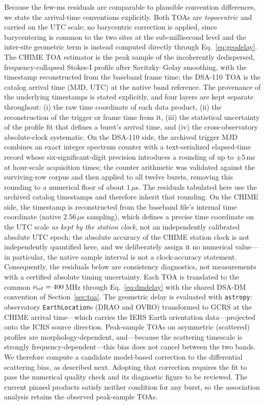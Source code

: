 Because the few-ms residuals are comparable to plausible convention
differences, we state the arrival-time conventions explicitly. Both TOAs are
\emph{topocentric} and carried on the UTC scale; no barycentric correction is
applied, since barycentering is common to the two sites at the
sub-millisecond level and the inter-site geometric term is instead computed
directly through Eq.~\eqref{eq:geodelay}. The CHIME TOA estimator is the peak
sample of the incoherently dedispersed, frequency-collapsed Stokes-I profile
after Savitzky--Golay smoothing, with the timestamp reconstructed from the
baseband frame time; the DSA-110 TOA is the catalog arrival time (MJD, UTC)
at the native band reference. The provenance of the underlying timestamps is
stated explicitly, and four layers are kept separate throughout: (i) the raw
time coordinate of each data product, (ii) the reconstruction of the trigger
or frame time from it, (iii) the statistical uncertainty of the profile fit
that defines a burst's arrival time, and (iv) the cross-observatory
absolute-clock systematic. On the DSA-110 side, the archived trigger MJD
combines an exact integer spectrum counter with a text-serialized elapsed-time
record whose six-significant-digit precision introduces a rounding of up to
$\pm5$\,ms at hour-scale acquisition times; the counter arithmetic was
validated against the surviving-row corpus and then applied to all twelve
bursts, removing this rounding to a numerical floor of about $1\,\mu$s. The residuals
tabulated here use the archived catalog timestamps and therefore inherit that
rounding. On the CHIME side, the timestamp is reconstructed from
the baseband file's internal time coordinate (native $2.56\,\mu$s sampling),
which defines a precise time coordinate on the UTC scale \emph{as kept by the
station clock}, not an independently calibrated absolute UTC epoch; the absolute
accuracy of the CHIME station clock is not independently quantified here, and
we deliberately assign it no numerical value---in particular, the native
sample interval is not a clock-accuracy statement. Consequently, the residuals
below are consistency diagnostics, not measurements with a certified absolute
timing uncertainty. Each TOA is translated to the common
$\nu_{\rm ref}=400$\,MHz through Eq.~\eqref{eq:dmdelay} with the shared
DSA-DM convention of Section~\ref{sec:toa}. The geometric delay is evaluated
with \texttt{astropy}: observatory \texttt{EarthLocation}s (DRAO and OVRO)
transformed to GCRS at the CHIME arrival time---which carries the IERS Earth
orientation data---projected onto the ICRS source direction.
Peak-sample TOAs on asymmetric (scattered) profiles are
morphology-dependent, and---because the scattering timescale is strongly
frequency-dependent---this bias does not cancel between the two bands. We
therefore compute a candidate model-based correction to the differential
scattering bias, as described next. Adopting that correction requires the fit
to pass the numerical quality check and its diagnostic figure to be
reviewed. The current pinned products satisfy neither condition for any burst,
so the association analysis retains the observed peak-sample TOAs.

